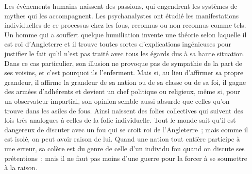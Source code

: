 
{Les événements humains
naissent des passions, qui engendrent les systèmes de mythes qui les
accompagnent. Les psychanalystes ont étudié les manifestations
individuelles de ce processus chez les fous, reconnus ou non reconnus
comme tels. Un homme qui a souffert quelque humiliation invente une
théorie selon laquelle il est roi d'Angleterre et il trouve toutes
sortes d'explications ingénieuses pour justifier le fait qu'il n'est
pas traité avec tous les égards dus à sa haute situation. Dans ce cas
particulier, son illusion ne provoque pas de sympathie de la part de
ses voisins, et c'est pourquoi ils l'enferment. Mais si, au lieu
d'affirmer sa propre grandeur, il affirme la grandeur de sa nation ou
de sa classe ou de sa foi, il gagne des armées d'adhérents et devient
un chef politique ou religieux, même si, pour un observateur
impartial, son opinion semble aussi absurde que celles qu'on trouve
dans les asiles de fous. Ainsi naissent des folies collectives qui
suivent des lois très analogues à celles de la folie individuelle.
Tout le monde sait qu'il est dangereux de discuter avec un fou qui se
croit roi de l'Angleterre~; mais comme il est isolé, on peut avoir
raison de lui. Quand une nation tout entière participe à une erreur,
sa colère est du genre de celle d'un individu fou quand on discute
ses prétentions~; mais il ne faut pas moins d'une guerre pour la
forcer à se soumettre à la raison.
}


